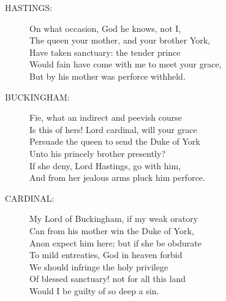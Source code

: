 \documentclass{article}
\begin{document}
\begin{description}
\item[HASTINGS:] 
\hspace{1pt}On what occasion, God he knows, not I,\\
\hspace{1pt}The queen your mother, and your brother York,\\
\hspace{1pt}Have taken sanctuary: the tender prince\\
\hspace{1pt}Would fain have come with me to meet your grace,\\
\hspace{1pt}But by his mother was perforce withheld.\\
\end{description}
\begin{description}
\item[BUCKINGHAM:] 
\hspace{1pt}Fie, what an indirect and peevish course\\
\hspace{1pt}Is this of hers! Lord cardinal, will your grace\\
\hspace{1pt}Persuade the queen to send the Duke of York\\
\hspace{1pt}Unto his princely brother presently?\\
\hspace{1pt}If she deny, Lord Hastings, go with him,\\
\hspace{1pt}And from her jealous arms pluck him perforce.\\
\end{description}
\begin{description}
\item[CARDINAL:] 
\hspace{1pt}My Lord of Buckingham, if my weak oratory\\
\hspace{1pt}Can from his mother win the Duke of York,\\
\hspace{1pt}Anon expect him here; but if she be obdurate\\
\hspace{1pt}To mild entreaties, God in heaven forbid\\
\hspace{1pt}We should infringe the holy privilege\\
\hspace{1pt}Of blessed sanctuary! not for all this land\\
\hspace{1pt}Would I be guilty of so deep a sin.\\
\end{description}
\end{document}
